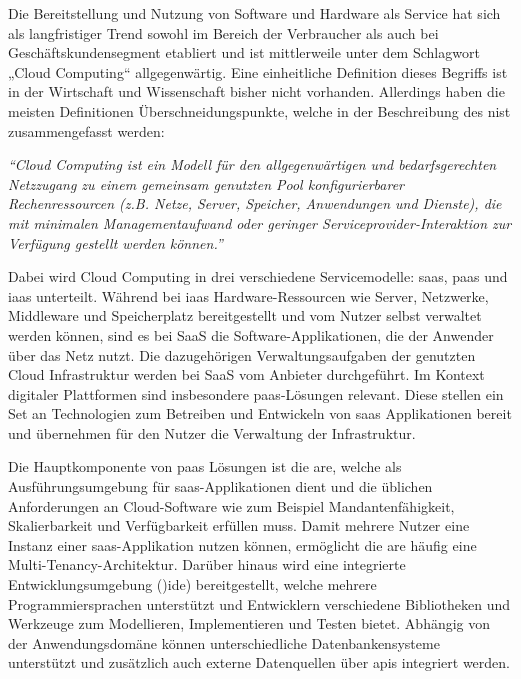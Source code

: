 Die Bereitstellung und Nutzung von Software und Hardware als Service hat sich als langfristiger Trend sowohl im Bereich der Verbraucher als auch bei Geschäftskundensegment etabliert und ist mittlerweile unter dem Schlagwort „Cloud Computing“ allgegenwärtig. Eine einheitliche Definition dieses Begriffs ist in der Wirtschaft und Wissenschaft bisher nicht vorhanden. Allerdings haben die meisten Definitionen Überschneidungspunkte, welche in der Beschreibung des \ac{nist} zusammengefasst werden: 

\begin{center}
    \textit{\enquote{Cloud Computing ist ein Modell für den allgegenwärtigen und bedarfsgerechten Netzzugang zu einem gemeinsam genutzten Pool konfigurierbarer Rechenressourcen (z.B. Netze, Server, Speicher, Anwendungen und Dienste), die mit minimalen Managementaufwand oder geringer Serviceprovider-Interaktion zur Verfügung gestellt werden können.}} \autocite[S. 2]{MELL2011}
\end{center}

Dabei wird Cloud Computing in drei verschiedene Servicemodelle: \ac{saas}, \ac{paas} und \ac{iaas} unterteilt. Während bei \ac{iaas} Hardware-Ressourcen wie Server, Netzwerke, Middleware und Speicherplatz bereitgestellt und vom Nutzer selbst verwaltet werden können, sind es bei SaaS die Software-Applikationen, die der Anwender über das Netz nutzt. Die dazugehörigen Verwaltungsaufgaben der genutzten Cloud Infrastruktur werden bei SaaS vom Anbieter durchgeführt. Im Kontext digitaler Plattformen sind insbesondere \ac{paas}-Lösungen relevant.\autocite[Vgl.][S. 2f]{MELL2011} Diese stellen ein Set an Technologien zum Betreiben und Entwickeln von \ac{saas} Applikationen bereit und übernehmen für den Nutzer die Verwaltung der Infrastruktur.\autocite[Vgl.][S. 8]{BRAUNINGER2012}

Die Hauptkomponente von \ac{paas} Lösungen ist die \ac{are}, welche als Ausführungsumgebung für \ac{saas}-Applikationen dient und die üblichen Anforderungen an Cloud-Software wie zum Beispiel Mandantenfähigkeit, Skalierbarkeit und Verfügbarkeit erfüllen muss. Damit mehrere Nutzer eine Instanz einer \ac{saas}-Applikation nutzen können, ermöglicht die \ac{are} häufig eine Multi-Tenancy-Architektur. Darüber hinaus wird eine integrierte Entwicklungsumgebung ()\acs{ide}) bereitgestellt, welche mehrere Programmiersprachen unterstützt und Entwicklern verschiedene Bibliotheken und Werkzeuge zum Modellieren, Implementieren und Testen bietet. Abhängig von der Anwendungsdomäne können unterschiedliche Datenbankensysteme unterstützt und zusätzlich auch externe Datenquellen über \acp{api} integriert werden. \autocite[Vgl.][S. 371]{BEIMBORN2011}

